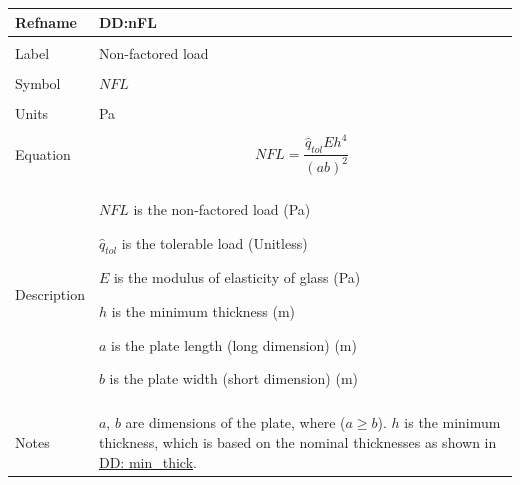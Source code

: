 \documentclass[12pt]{article}
\begin{document}
\noindent \begin{minipage}{\textwidth}
\begin{tabular}{p{} p{}}
\toprule \textbf{Refname} & \textbf{DD:nFL}
\label{DD:nFL}
\\ \midrule \\
Label & Non-factored load
        \\ \midrule \\
        Symbol & $NFL$
                 \\ \midrule \\
                 Units & Pa
                         \\ \midrule \\
                         Equation & \begin{displaymath}
                                    NFL=\frac{{\hat{q}_{tol}} E h^{4}}{\left(a b\right)^{2}}
                                    \end{displaymath}
                                    \\ \midrule \\
                                    Description & \begin{symbDescription}
                                                  \item{$NFL$ is the non-factored load (Pa)}
                                                  \item{${\hat{q}_{tol}}$ is the tolerable load (Unitless)}
                                                  \item{$E$ is the modulus of elasticity of glass (Pa)}
                                                  \item{$h$ is the minimum thickness (m)}
                                                  \item{$a$ is the plate length (long dimension) (m)}
                                                  \item{$b$ is the plate width (short dimension) (m)}
                                                  \end{symbDescription}
                                                  \\ \midrule \\
                                                  Notes & $a$, $b$ are dimensions of the plate, where ($a\geq{}b$).
                                                          $h$ is the minimum thickness, which is based on the nominal thicknesses as shown in \hyperref[DD:min.thick]{DD: min\_thick}.

\end{tabular}
\end{minipage}
\end{document}
